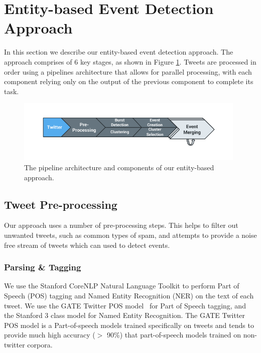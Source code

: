 
\section{Entity-based Event Detection Approach}
\label{detection:sec:approach}
In this section we describe our entity-based event detection approach.
The approach comprises of 6 key stages, as shown in Figure \ref{detection:graphic:pipeline}.
Tweets are processed in order using a pipelines architecture that allows for parallel processing, with each component relying only on the output of the previous component to complete its task.

\vspace{0.5cm}
\begin{figure}[h!]
	\centering
	\includegraphics[width=11cm,trim=1.5cm 1cm 1.5cm 0.8cm]{Chapters/EntityDetection/images/system.pdf}
	\caption{The pipeline architecture and components of our entity-based approach.}
	\label{detection:graphic:pipeline}
\end{figure}

\subsection{Tweet Pre-processing}
Our approach uses a number of pre-processing steps.
This helps to filter out unwanted tweets, such as common types of spam, and attempts to provide a noise free stream of tweets which can used to detect events.

\subsubsection{Parsing \& Tagging}
\label{detection:sec:parsing}
We use the Stanford CoreNLP Natural Language Toolkit to perform Part of Speech (POS) tagging and Named Entity Recognition (NER) on the text of each tweet.
We  use the GATE Twitter POS model~\citep{TwitterPOS} for Part of Speech tagging, and the Stanford 3 class model for Named Entity Recognition.
The GATE Twitter POS model is a Part-of-speech models trained specifically on tweets and tends to provide much high accuracy ($>$ 90\%) that part-of-speech models trained on non-twitter corpora.

